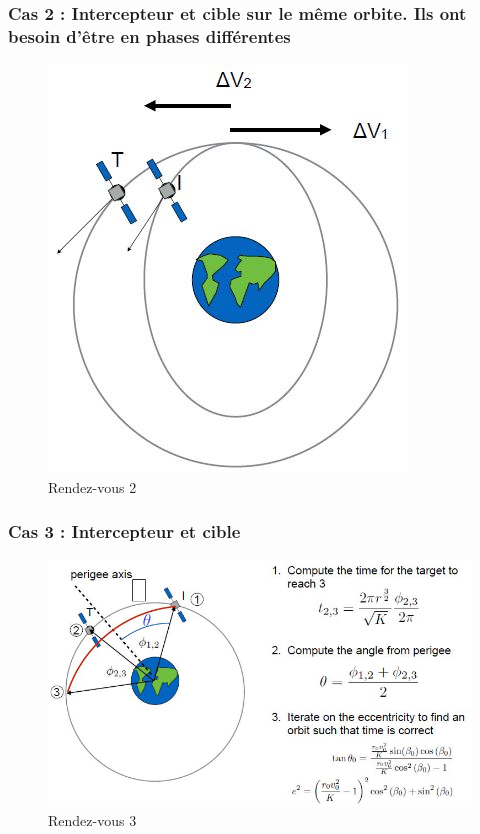 \documentclass{report}
\begin{document}
\subsubsection{Cas 2 : Intercepteur et cible sur le même orbite. Ils ont besoin d'être en phases différentes }

\begin{figure}[h!]
    \centering
    \includegraphics[scale=0.6]{58.JPG}
    \caption{Rendez-vous 2}
    \label{58}
\end{figure}

\subsubsection{Cas 3 : Intercepteur et cible}

\begin{figure}[h!]
    \centering
    \includegraphics[scale=0.6]{59.JPG}
    \caption{Rendez-vous 3}
    \label{59}
\end{figure}
\end{document}
